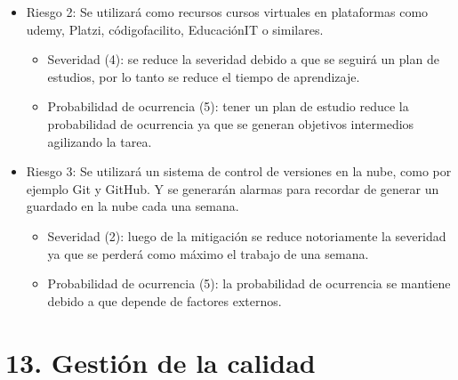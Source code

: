 \documentclass[11pt]{charter}
\begin{document}
\begin{itemize}
\item Riesgo 2: Se utilizará como recursos cursos virtuales en plataformas como udemy, Platzi, códigofacilito, EducaciónIT o similares.
	\begin{itemize}
	\item Severidad (4): se reduce la severidad debido a que se seguirá un plan de estudios, por lo tanto se reduce el tiempo de aprendizaje.
	\item Probabilidad de ocurrencia (5): tener un plan de estudio reduce la probabilidad de ocurrencia ya que se generan objetivos intermedios agilizando la tarea. 
	\end{itemize}
\item Riesgo 3: Se utilizará un sistema de control de versiones en la nube, como por ejemplo Git y GitHub. Y se generarán alarmas para recordar de generar un guardado en la nube cada una semana.
	\begin{itemize}
	\item Severidad (2): luego de la mitigación se reduce notoriamente la severidad ya que se perderá como máximo el trabajo de una semana.
	\item Probabilidad de ocurrencia (5): la probabilidad de ocurrencia se mantiene debido a que depende de factores externos. 
	\end{itemize}
\end{itemize}  
 

\section{13. Gestión de la calidad}
\label{sec:calidad}
\end{document}
